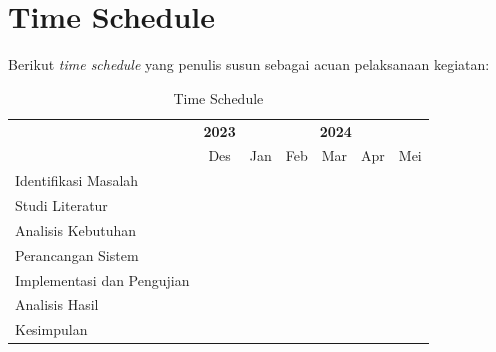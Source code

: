 \documentclass[10pt,]{report}
\begin{document}
\section{Time Schedule}
\begin{adjustwidth}{20pt}{}
	Berikut \textit{time schedule} yang penulis susun sebagai acuan pelaksanaan
	kegiatan:
	\begin{table}[H]
		\caption{Time Schedule}
		\begin{tabular}{|p{2cm}|c|c|c|c|c|c|}
			\hline
			\multicolumn{1}{|c|}{\multirow{2}{*}{\centering{\textbf{Kegiatan}}}} & \textbf{2023}     & \multicolumn{5}{|c|}{\textbf{2024}}                                                                                 \\
			\cline{2-7}
			                                                                     & Des               & Jan                                 & Feb               & Mar               & Apr               & Mei               \\
			\hline
			Identifikasi Masalah                                                 & \cellcolor{green} &                                     &                   &                   &                   &                   \\
			\hline
			Studi Literatur                                                      &                   & \cellcolor{green}                   &                   &                   &                   &                   \\
			\hline
			Analisis Kebutuhan                                                   &                   & \cellcolor{green}                   &                   &                   &                   &                   \\
			\hline
			Perancangan Sistem                                                   &                   &                                     & \cellcolor{green} & \cellcolor{green} &                   &                   \\
			\hline
			Implementasi dan Pengujian                                           &                   &                                     &                   &                   & \cellcolor{green} &                   \\
			\hline
			Analisis Hasil                                                       &                   &                                     &                   &                   &                   & \cellcolor{green} \\
			\hline
			Kesimpulan                                                           &                   &                                     &                   &                   &                   & \cellcolor{green} \\
			\hline
		\end{tabular}
	\end{table}

\end{adjustwidth}
\end{document}
